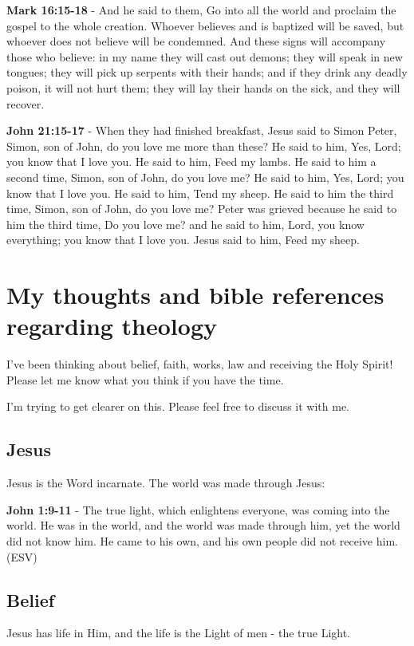 \documentclass[11pt]{article}
\begin{document}
\textbf{Mark 16:15-18} - And he said to them, Go into all the world and proclaim the gospel to the whole creation. Whoever believes and is baptized will be saved, but whoever does not believe will be condemned. And these signs will accompany those who believe: in my name they will cast out demons; they will speak in new tongues; they will pick up serpents with their hands; and if they drink any deadly poison, it will not hurt them; they will lay their hands on the sick, and they will recover.

\textbf{John 21:15-17} - When they had finished breakfast, Jesus said to Simon Peter, Simon, son of John, do you love me more than these? He said to him, Yes, Lord; you know that I love you. He said to him, Feed my lambs. He said to him a second time, Simon, son of John, do you love me? He said to him, Yes, Lord; you know that I love you. He said to him, Tend my sheep. He said to him the third time, Simon, son of John, do you love me? Peter was grieved because he said to him the third time, Do you love me? and he said to him, Lord, you know everything; you know that I love you. Jesus said to him, Feed my sheep.

\section{My thoughts and bible references regarding theology}
\label{sec:org62ee218}
I've been thinking about belief, faith, works, law and receiving the Holy Spirit!
Please let me know what you think if you have the time.

I'm trying to get clearer on this.
Please feel free to discuss it with me.

\subsection{Jesus}
\label{sec:org6754b46}
Jesus is the Word incarnate. The world was made through Jesus:

\textbf{John 1:9-11} - The true light, which enlightens everyone, was coming into the world. He was in the world, and the world was made through him, yet the world did not know him. He came to his own, and his own people did not receive him. (ESV)

\subsection{Belief}
\label{sec:orgc25e872}
Jesus has life in Him, and the life is the Light of men - the true Light.
\end{document}
